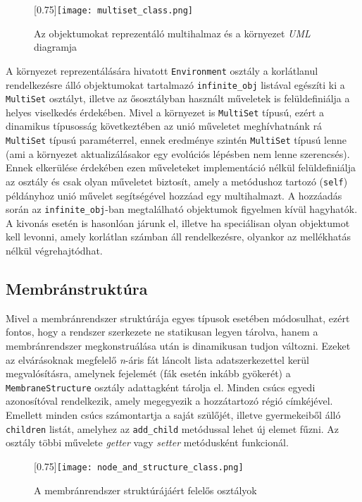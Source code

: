\begin{figure}[H]
\centering
	\scalebox{0.75}[0.75]{\texttt{[image: multiset\_class.png]}}
	\caption{Az objektumokat reprezentáló multihalmaz és a környezet \textit{UML} diagramja}
	\label{fig:multiset_uml}
\end{figure}

A környezet reprezentálására hivatott \verb|Environment| osztály a korlátlanul rendelkezésre álló objektumokat tartalmazó \verb|infinite_obj| listával egészíti ki a \verb|MultiSet| osztályt, illetve az ősosztályban használt műveletek is felüldefiniálja a helyes viselkedés érdekében. Mivel a környezet is \verb|MultiSet| típusú, ezért a dinamikus típusosság következtében az unió műveletet meghívhatnánk rá \verb|MultiSet| típusú paraméterrel, ennek eredménye szintén \verb|MultiSet| típusú lenne (ami a környezet aktualizálásakor egy evolúciós lépésben nem lenne szerencsés). Ennek elkerülése érdekében ezen műveleteket implementáció nélkül felüldefiniálja az osztály és csak olyan műveletet biztosít, amely a metódushoz tartozó (\verb|self|)  példányhoz unió művelet segítségével hozzáad egy multihalmazt. A hozzáadás során az \verb|infinite_obj|-ban megtalálható objektumok figyelmen kívül hagyhatók. A kivonás esetén is hasonlóan járunk el, illetve ha speciálisan olyan objektumot kell levonni, amely korlátlan számban áll rendelkezésre, olyankor az mellékhatás nélkül végrehajtódhat.

\subsection{Membránstruktúra}

Mivel a membránrendszer struktúrája egyes típusok esetében módosulhat, ezért fontos, hogy a rendszer szerkezete ne statikusan legyen tárolva, hanem a membránrendszer megkonstruálása után is dinamikusan tudjon változni.  Ezeket az elvárásoknak megfelelő \textit{n}-áris fát láncolt lista adatszerkezettel kerül megvalósításra, amelynek fejelemét (fák esetén inkább gyökerét)  a \verb|MembraneStructure| osztály adattagként tárolja el. Minden csúcs egyedi azonosítóval rendelkezik, amely megegyezik a hozzátartozó régió címkéjével. Emellett minden csúcs számontartja a saját szülőjét, illetve gyermekeiből álló \verb|children| listát, amelyhez az \verb|add_child| metódussal lehet új elemet fűzni. Az osztály többi művelete \textit{getter} vagy \textit{setter} metódusként funkcionál.

\begin{figure}[H]
\centering
	\scalebox{0.75}[0.75]{\texttt{[image: node\_and\_structure\_class.png]}}
	\caption{A membránrendszer struktúrájáért felelős osztályok}
	\label{fig:node_and_structure_uml}
\end{figure}



